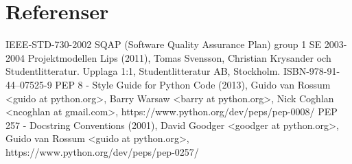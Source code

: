 \section{Referenser}

IEEE-STD-730-2002 SQAP (Software Quality Assurance Plan) group 1 SE 2003-2004
\newline
\newline
Projektmodellen Lips (2011), Tomas Svensson, Christian Krysander och Studentlitteratur. Upplaga 1:1, Studentlitteratur AB, Stockholm. ISBN-978-91-44--07525-9
\newline
\newline
PEP 8 - Style Guide for Python Code (2013), Guido van Rossum \textless guido at python.org\textgreater,
\newline
Barry Warsaw \textless barry at python.org\textgreater, Nick Coghlan \textless ncoghlan at gmail.com\textgreater,
\newline
https://www.python.org/dev/peps/pep-0008/
\newline
\newline
PEP 257 - Docstring Conventions (2001), David Goodger \textless goodger at python.org\textgreater, Guido van Rossum \textless guido at python.org\textgreater,
https://www.python.org/dev/peps/pep-0257/


